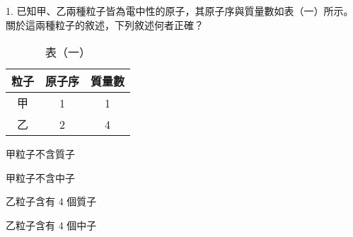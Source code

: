 \documentclass[12pt]{article}
\begin{document}
\begin{problem}
  \item[1.] 已知甲、乙兩種粒子皆為電中性的原子，其原子序與質量數如表（一）所示。關於這兩種粒子的敘述，下列敘述何者正確？
  \begin{table}[ht]
    \centering
    \renewcommand{\arraystretch}{1.2}
    \vspace*{-1ex}
    \caption*{表（一）}
    \vspace*{-1ex}
    \begin{tabular}{|c|c|c|}
      \hline
      粒子 & 原子序 & 質量數 \\ \hline
      甲 & 1 & 1 \\ \hline
      乙 & 2 & 4 \\ \hline
    \end{tabular}
  \end{table}
  \begin{choices}
    \item 甲粒子不含質子
    \item 甲粒子不含中子
    \item 乙粒子含有 4 個質子
    \item 乙粒子含有 4 個中子
  \end{choices}
\end{problem}
\end{document}
